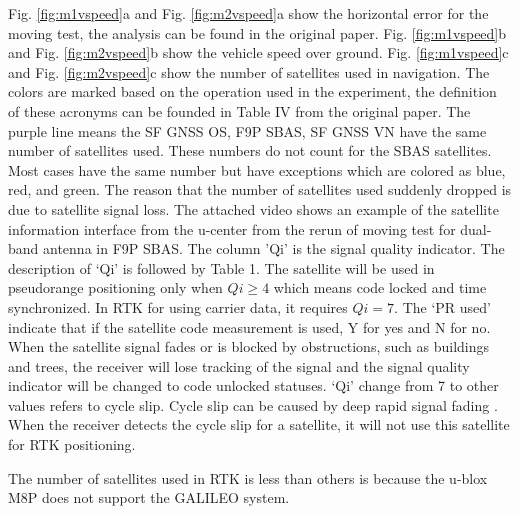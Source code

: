 \documentclass[letterpaper, 10 pt,onecolumn]{article}
\begin{document}
	Fig. \ref{fig:m1vspeed}a and Fig. \ref{fig:m2vspeed}a show the horizontal error for the moving test, the analysis can be found in the original paper. Fig. \ref{fig:m1vspeed}b and Fig. \ref{fig:m2vspeed}b show the vehicle speed over ground. Fig. \ref{fig:m1vspeed}c and Fig. \ref{fig:m2vspeed}c show the number of satellites used in navigation. The colors are marked based on the operation used in the experiment, the definition of these acronyms can be founded in Table IV from the original paper. The purple line means the SF GNSS OS, F9P SBAS, SF GNSS VN have the same number of satellites used. These numbers do not count for the SBAS satellites.
	Most cases have the same number but have exceptions which are colored as blue, red, and green. The reason that the number of satellites used suddenly dropped is due to satellite signal loss. The attached video shows an example of the satellite information interface from the u-center from the rerun of moving test for dual-band antenna in F9P SBAS. The column 'Qi' is the signal quality indicator. The description of `Qi' is followed by Table 1. The satellite will be used in pseudorange positioning only when $Qi \geq 4$ which means code locked and time synchronized. In RTK for using carrier data, it requires $Qi = 7$. The `PR used' indicate that if the satellite code measurement is used, Y for yes and N for no. When the satellite signal fades or is blocked by obstructions, such as buildings and trees, the receiver will lose tracking of the signal and the signal quality indicator will be changed to code unlocked statuses. `Qi' change from 7 to other values refers to cycle slip. Cycle slip can be caused by deep rapid signal fading \cite{sennott1992use}. When the receiver detects the cycle slip for a satellite, it will not use this satellite for RTK positioning.
	
	The number of satellites used in RTK is less than others is because the u-blox M8P does not support the GALILEO system.
	
\end{document}
